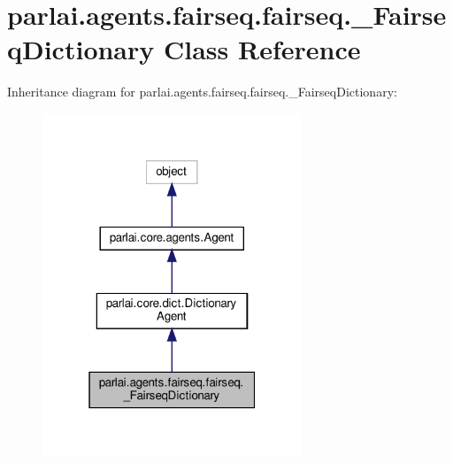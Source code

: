 \hypertarget{classparlai_1_1agents_1_1fairseq_1_1fairseq_1_1__FairseqDictionary}{}\section{parlai.\+agents.\+fairseq.\+fairseq.\+\_\+\+Fairseq\+Dictionary Class Reference}
\label{classparlai_1_1agents_1_1fairseq_1_1fairseq_1_1__FairseqDictionary}


Inheritance diagram for parlai.\+agents.\+fairseq.\+fairseq.\+\_\+\+Fairseq\+Dictionary\+:
\nopagebreak
\begin{figure}[H]
\begin{center}
\leavevmode
\includegraphics[width=220pt]{classparlai_1_1agents_1_1fairseq_1_1fairseq_1_1__FairseqDictionary__inherit__graph}
\end{center}
\end{figure}


